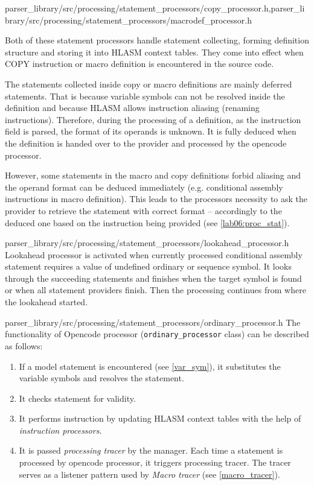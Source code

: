 {parser\_library/src/processing/statement\_processors/copy\_processor.h,parser\_library/src/processing/statement\_processors/macrodef\_processor.h}

Both of these statement processors handle statement collecting, forming definition structure and storing it into HLASM context tables. They come into effect when COPY instruction or macro definition is encountered in the source code. 

The statements collected inside copy or macro definitions are mainly deferred statements. That is because variable symbols can not be resolved inside the definition and because HLASM allows instruction aliasing (renaming instructions). Therefore, during the processing of a definition, as the instruction field is parsed, the format of its operands is unknown. It is fully deduced when the definition is handed over to the provider and processed by the opencode processor.

However, some statements in the macro and copy definitions forbid aliasing and the operand format can be deduced immediately (e.g. conditional assembly instructions in macro definition). This leads to the processors necessity to ask the provider to retrieve the statement with correct format -- accordingly to the deduced one based on the instruction being provided  (see \cref{lab06:proc_stat}).

{parser\_library/src/processing/statement\_processors/lookahead\_processor.h}
\label{lab06:look}
Lookahead processor is activated when currently processed conditional assembly statement requires a value of undefined ordinary or sequence symbol. It looks through the succeeding statements and finishes when the target symbol is found or when all statement providers finish. Then the processing continues from where the lookahead started.

{parser\_library/src/processing/statement\_processors/ordinary\_processor.h}
\label{ord_proc}
The functionality of Opencode processor (\texttt{ordinary\_processor} class) can be described as follows:
\begin{enumerate}
	\item If a model statement is encountered (see \cref{var_sym}), it substitutes the variable symbols and resolves the statement.
	\item It checks statement for validity.
	\item It performs instruction by updating HLASM context tables with the help of \emph{instruction processors}.
	\item It is passed \emph{processing tracer} by the manager. Each time a statement is processed by opencode processor, it triggers processing tracer. The tracer serves as a listener pattern used by \emph{Macro tracer} (see \cref{macro_tracer}).
\end{enumerate}

